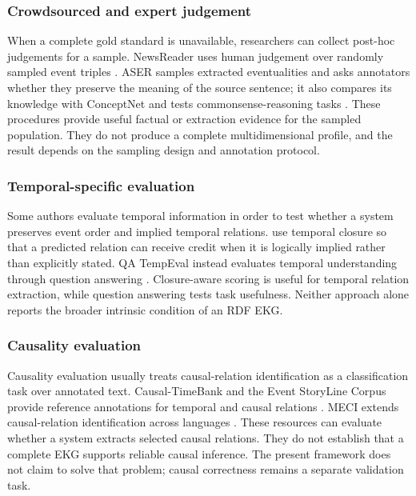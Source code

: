 \subsubsection{Crowdsourced and expert judgement}

When a complete gold standard is unavailable, researchers can collect post-hoc judgements for a sample. NewsReader uses human judgement over randomly sampled event triples \citep{newsreader2016}. ASER samples extracted eventualities and asks annotators whether they preserve the meaning of the source sentence; it also compares its knowledge with ConceptNet and tests commonsense-reasoning tasks \citep{aser2019}. These procedures provide useful factual or extraction evidence for the sampled population. They do not produce a complete multidimensional profile, and the result depends on the sampling design and annotation protocol.

\subsubsection{Temporal-specific evaluation}

Some authors evaluate temporal information in order to test whether a system preserves event order and implied temporal relations. \citet{tempeval2011} use temporal closure so that a predicted relation can receive credit when it is logically implied rather than explicitly stated. QA TempEval instead evaluates temporal understanding through question answering \citep{qatempeval2015}. Closure-aware scoring is useful for temporal relation extraction, while question answering tests task usefulness. Neither approach alone reports the broader intrinsic condition of an RDF EKG.

\subsubsection{Causality evaluation}

Causality evaluation usually treats causal-relation identification as a classification task over annotated text. Causal-TimeBank and the Event StoryLine Corpus provide reference annotations for temporal and causal relations \citep{causaltimebank2014,storyline2017}. MECI extends causal-relation identification across languages \citep{meci2022}. These resources can evaluate whether a system extracts selected causal relations. They do not establish that a complete EKG supports reliable causal inference. The present framework does not claim to solve that problem; causal correctness remains a separate validation task.

